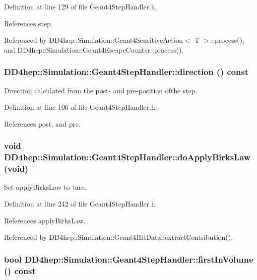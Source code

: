 Definition at line 129 of file Geant4StepHandler.h.

References step.

Referenced by DD4hep::Simulation::Geant4SensitiveAction$<$ T $>$::process(), and DD4hep::Simulation::Geant4EscapeCounter::process().\hypertarget{class_d_d4hep_1_1_simulation_1_1_geant4_step_handler_aa44b96c9905fb7da6a8a8dd95b39abea}{
\subsubsection[{direction}]{ DD4hep::Simulation::Geant4StepHandler::direction () const}}
\label{class_d_d4hep_1_1_simulation_1_1_geant4_step_handler_aa44b96c9905fb7da6a8a8dd95b39abea}


Direction calculated from the post-\/ and pre-\/position ofthe step. 

Definition at line 106 of file Geant4StepHandler.h.

References post, and pre.\hypertarget{class_d_d4hep_1_1_simulation_1_1_geant4_step_handler_a67ef04d7d190e233ae9f3a23d5aedf33}{
\subsubsection[{doApplyBirksLaw}]{\setlength{\rightskip}{0pt plus 5cm}void DD4hep::Simulation::Geant4StepHandler::doApplyBirksLaw (void)}}
\label{class_d_d4hep_1_1_simulation_1_1_geant4_step_handler_a67ef04d7d190e233ae9f3a23d5aedf33}


Set applyBirksLaw to ture. 

Definition at line 242 of file Geant4StepHandler.h.

References applyBirksLaw.

Referenced by DD4hep::Simulation::Geant4HitData::extractContribution().\hypertarget{class_d_d4hep_1_1_simulation_1_1_geant4_step_handler_af92e626fd9c595d566a2ad50dc309fd0}{
\subsubsection[{firstInVolume}]{\setlength{\rightskip}{0pt plus 5cm}bool DD4hep::Simulation::Geant4StepHandler::firstInVolume () const}}
\label{class_d_d4hep_1_1_simulation_1_1_geant4_step_handler_af92e626fd9c595d566a2ad50dc309fd0}


